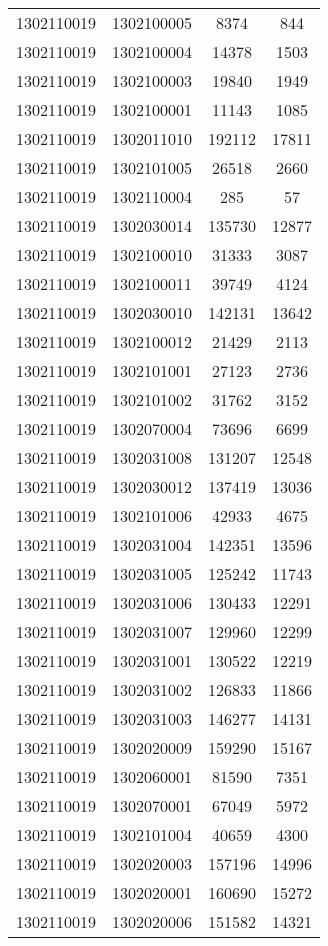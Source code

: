 \begin{longtable}[h]{llcc}
		1302110019 & 1302100005 & 8374 & 844\\
		1302110019 & 1302100004 & 14378 & 1503\\
		1302110019 & 1302100003 & 19840 & 1949\\
		1302110019 & 1302100001 & 11143 & 1085\\
		1302110019 & 1302011010 & 192112 & 17811\\
		1302110019 & 1302101005 & 26518 & 2660\\
		1302110019 & 1302110004 & 285 & 57\\
		1302110019 & 1302030014 & 135730 & 12877\\
		1302110019 & 1302100010 & 31333 & 3087\\
		1302110019 & 1302100011 & 39749 & 4124\\
		1302110019 & 1302030010 & 142131 & 13642\\
		1302110019 & 1302100012 & 21429 & 2113\\
		1302110019 & 1302101001 & 27123 & 2736\\
		1302110019 & 1302101002 & 31762 & 3152\\
		1302110019 & 1302070004 & 73696 & 6699\\
		1302110019 & 1302031008 & 131207 & 12548\\
		1302110019 & 1302030012 & 137419 & 13036\\
		1302110019 & 1302101006 & 42933 & 4675\\
		1302110019 & 1302031004 & 142351 & 13596\\
		1302110019 & 1302031005 & 125242 & 11743\\
		1302110019 & 1302031006 & 130433 & 12291\\
		1302110019 & 1302031007 & 129960 & 12299\\
		1302110019 & 1302031001 & 130522 & 12219\\
		1302110019 & 1302031002 & 126833 & 11866\\
		1302110019 & 1302031003 & 146277 & 14131\\
		1302110019 & 1302020009 & 159290 & 15167\\
		1302110019 & 1302060001 & 81590 & 7351\\
		1302110019 & 1302070001 & 67049 & 5972\\
		1302110019 & 1302101004 & 40659 & 4300\\
		1302110019 & 1302020003 & 157196 & 14996\\
		1302110019 & 1302020001 & 160690 & 15272\\
		1302110019 & 1302020006 & 151582 & 14321\\

\end{longtable}
